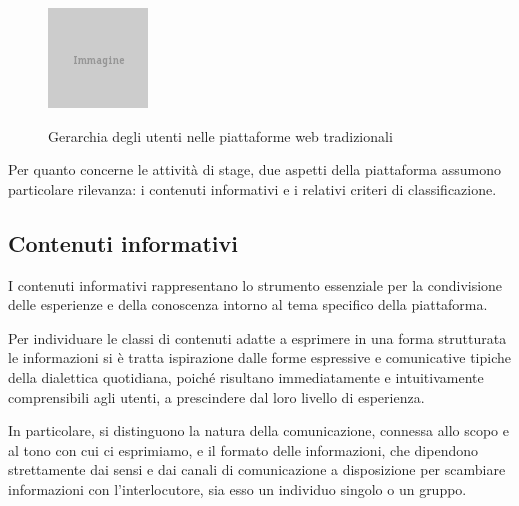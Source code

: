 \begin{figure}[ht]
	\begin{center}
		\includegraphics{img/placeholder.png}
		\label{fig:tesi:progetto:gerarchia-utenti}
		\caption{Gerarchia degli utenti nelle piattaforme web tradizionali}
	\end{center}
\end{figure}

Per quanto concerne le attività di stage, due aspetti della piattaforma assumono particolare rilevanza: i contenuti informativi e i relativi criteri di classificazione.

\subsection{Contenuti informativi}
\label{sec:tesi:progetto:contenuti}
I contenuti informativi rappresentano lo strumento essenziale per la condivisione delle esperienze e della conoscenza intorno al tema specifico della piattaforma.

Per individuare le classi di contenuti adatte a esprimere in una forma strutturata le informazioni si è tratta ispirazione dalle forme espressive e comunicative tipiche della dialettica quotidiana, poiché risultano immediatamente e intuitivamente comprensibili agli utenti, a prescindere dal loro livello di esperienza.

In particolare, si distinguono la natura della comunicazione, connessa allo scopo e al tono con cui ci esprimiamo, e il formato delle informazioni, che dipendono strettamente dai sensi e dai canali di comunicazione a disposizione per scambiare informazioni con l'interlocutore, sia esso un individuo singolo o un gruppo.


